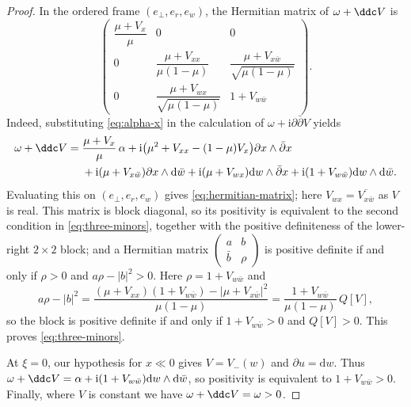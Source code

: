 \documentclass[11pt,a4paper]{article}
\begin{document}
\begin{proof}
		In the ordered frame $(e_\perp,e_r,e_w)$, the Hermitian matrix of
		$\omega+\ddc V$ is
		\begin{equation}\label{eq:hermitian-matrix}
			\begin{pmatrix}
				\dfrac{\mu+V_x}{\mu} & 0 & 0\\[6pt]
				0 & \dfrac{\mu+V_{xx}}{\mu(1-\mu)} &
				\dfrac{\mu+V_{x\bar w}}{\sqrt{\mu(1-\mu)}}\\[9pt]
				0 & \dfrac{\mu+V_{wx}}{\sqrt{\mu(1-\mu)}} & 1+V_{w\bar w}
			\end{pmatrix}.
		\end{equation}
		Indeed, substituting \eqref{eq:alpha-x} in the calculation of
		$\omega+\mathrm{i}\partial\bar\partial V$ yields
\begin{align}
 \omega+\ddc V
 ={}&\frac{\mu+V_x}{\mu}\,\alpha
 +\mathrm{i}\bigl(\mu^2+V_{xx}-(1-\mu)V_x\bigr)
       \partial x\wedge\bar\partial x\notag\\
 &+\mathrm{i}(\mu+V_{x\bar w})
       \partial x\wedge\mathrm{d}\bar w
 +\mathrm{i}(\mu+V_{wx})
       \mathrm{d}w\wedge\bar\partial x\notag
 +\mathrm{i}(1+V_{w\bar w})
       \mathrm{d}w\wedge\mathrm{d}\bar w.
 \label{eq:omegaV-explicit}
\end{align}
        Evaluating this on
		$(e_\perp,e_r,e_w)$ gives \eqref{eq:hermitian-matrix}; here
		$V_{wx}=\overline{V_{x\bar w}}$ as $V$ is real.  This matrix is
		block diagonal, so its
		positivity is equivalent to the second condition in \eqref{eq:three-minors}, together with the
		positive definiteness of the lower-right $2\times2$ block; and a
		Hermitian matrix
		$\left(\begin{smallmatrix}a&b\\ \bar b&\rho\end{smallmatrix}\right)$
		is positive definite if and only if $\rho>0$ and $a\rho-|b|^2>0$.
		Here $\rho=1+V_{w\bar w}$ and
		\[
		a\rho-|b|^2
		=\frac{(\mu+V_{xx})(1+V_{w\bar w})-|\mu+V_{x\bar w}|^2}
		{\mu(1-\mu)}
		=\frac{1+V_{w\bar w}}{\mu(1-\mu)}\,Q[V],
		\]
		so the block is positive definite if and only if $1+V_{w\bar w}>0$
		and $Q[V]>0$.  This proves \eqref{eq:three-minors}.

		At $\xi=0$, our hypothesis for $x\ll 0$ gives $V=V_-(w)$ and
		$\partial u=\mathrm{d}w$.  Thus
		$\omega+\ddc V=\alpha+\mathrm{i}(1+V_{w\bar w})
		\mathrm{d}w\wedge\mathrm{d}\bar w$, so positivity is equivalent to
		$1+V_{w\bar w}>0$.  Finally, where $V$ is constant we have
		$\omega+\ddc V=\omega>0$.
	\end{proof}
\end{document}
